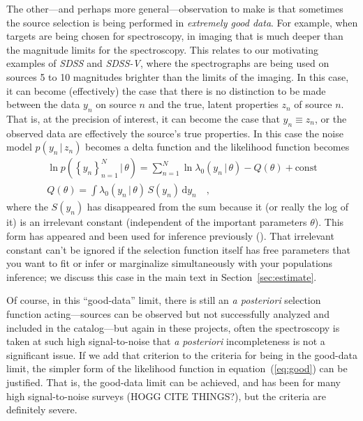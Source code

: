 \documentclass[modern]{aastex62}
\newcommand{\dd}{\mathrm{d}}
\newcommand{\given}{\,|\,}
\newcommand{\set}[1]{\left\{{#1}\right\}}
\newcommand{\sectionname}{Section}
\newcommand{\equationname}{equation}
\newcommand{\project}[1]{\textsl{#1}}
\newcommand{\foreign}[1]{\textsl{#1}}
\begin{document}
The other---and perhaps more general---observation to make is that
sometimes the source selection is being performed in \emph{extremely
  good data}.
For example, when targets are being chosen for spectroscopy, in
imaging that is much deeper than the magnitude limits for the
spectroscopy.
This relates to our motivating examples of \project{SDSS} and
\project{SDSS-V}, where the spectrographs are being used on sources 5
to 10 magnitudes brighter than the limits of the imaging.
In this case, it can become (effectively) the case that there is no
distinction to be made between the data $y_n$ on source $n$ and the
true, latent properties $z_n$ of source $n$.
That is, at the precision of interest, it can become the case that
$y_n\equiv z_n$, or the observed data are effectively the source's
true properties.
In this case the noise model $p(y_n\given z_n)$ becomes a
delta function and the likelihood function becomes
\begin{gather}
\ln p(\set{y_n}_{n=1}^{N}\given\theta)
 = \sum_{n=1}^N \ln\lambda_0(y_n\given \theta) - Q(\theta) + \mbox{const}
\label{eq:good}
\\
Q(\theta) = \int\lambda_0(y_n\given \theta)\,S(y_n)\,\dd y_n
\quad ,
\end{gather}
where the $S(y_n)$ has disappeared from the sum because it (or really
the log of it) is an irrelevant constant (independent of the important
parameters $\theta$).
This form has appeared and been used for inference previously (\citealt{bernstein, bovy}).
That irrelevant constant can't be ignored if the selection function
itself has free parameters that you want to fit or infer or
marginalize simultaneously with your populations inference;
we discuss this case in the main text in \sectionname~\ref{sec:estimate}.

Of course, in this ``good-data'' limit, there is still an
\foreign{a posteriori} selection function acting---sources can be
observed but not successfully analyzed and included in the
catalog---but again in these projects, often the spectroscopy is taken
at such high signal-to-noise that \foreign{a posteriori}
incompleteness is not a significant issue.
If we add that criterion to the criteria for being in the good-data
limit, the simpler form of the likelihood function in
\equationname~(\ref{eq:good}) can be justified.
That is, the good-data limit can be achieved, and has been for many
high signal-to-noise surveys (HOGG CITE THINGS?), but the criteria
are definitely severe.
\end{document}
